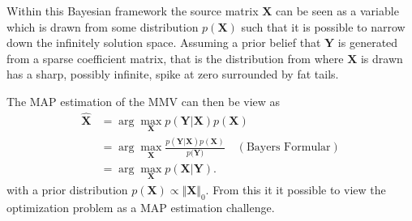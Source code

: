 Within this Bayesian framework the source matrix $\mathbf{X}$ can be seen as a variable which is drawn from some distribution $p(\mathbf{X})$ such that it is possible to narrow down the infinitely solution space. 
Assuming a prior belief that $\textbf{Y}$ is generated from a sparse coefficient matrix, that is the distribution from where $\textbf{X}$ is drawn has a sharp, possibly infinite, spike at zero surrounded by fat tails. 

The MAP estimation of the MMV can then be view as 
\begin{align*}
\hat{\mathbf{X}} &= \arg \max_{\mathbf{X}} p(\mathbf{Y} \vert \mathbf{X}) p(\mathbf{X}) \\
&= \arg \max_{\mathbf{X}} \frac{p(\mathbf{Y} \vert \mathbf{X}) p(\mathbf{X})}{p(\mathbf{Y)}} \quad (\text{Bayers Formular}) \\
&= \arg \max_{\mathbf{X}} p(\mathbf{X} \vert \mathbf{Y}).
\end{align*}
with a prior distribution $p(\mathbf{X}) \propto \Vert \mathbf{X} \Vert_0$. From this it it possible to view the optimization problem as a MAP estimation challenge.

 

